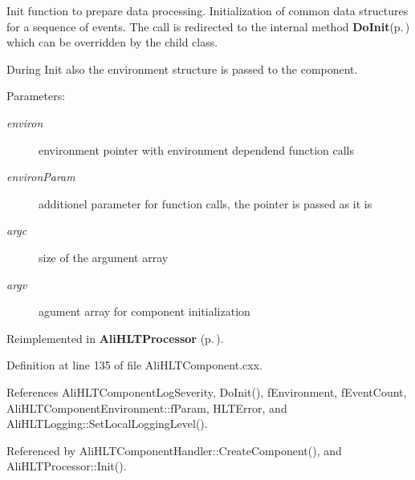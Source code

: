 Init function to prepare data processing. Initialization of common data structures for a sequence of events. The call is redirected to the internal method {\bf Do\-Init}{\rm (p.\,\pageref{classAliHLTComponent_b5})} which can be overridden by the child class.\par
 During Init also the environment structure is passed to the component. \begin{Desc}
\item[Parameters:]
\begin{description}
\item[{\em environ}]environment pointer with environment dependend function calls \item[{\em environ\-Param}]additionel parameter for function calls, the pointer is passed as it is \item[{\em argc}]size of the argument array \item[{\em argv}]agument array for component initialization \end{description}
\end{Desc}


Reimplemented in {\bf Ali\-HLTProcessor} {\rm (p.\,\pageref{classAliHLTProcessor_a2})}.

Definition at line 135 of file Ali\-HLTComponent.cxx.

References Ali\-HLTComponent\-Log\-Severity, Do\-Init(), f\-Environment, f\-Event\-Count, Ali\-HLTComponent\-Environment::f\-Param, HLTError, and Ali\-HLTLogging::Set\-Local\-Logging\-Level().

Referenced by Ali\-HLTComponent\-Handler::Create\-Component(), and Ali\-HLTProcessor::Init().

